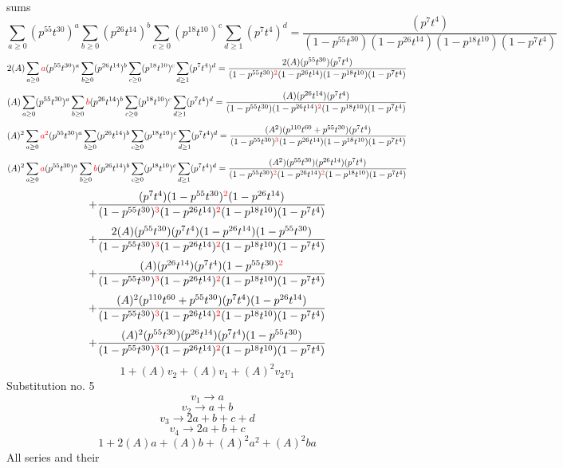 \documentclass{article}
\begin{document}
sums\[\sum_{a\geq{0}}(p^{55}t^{30})^{a}\sum_{b\geq{0}}(p^{26}t^{14})^{b}\sum_{c\geq{0}}(p^{18}t^{10})^{c}\sum_{d\geq{1}}(p^{7}t^{4})^{d}=\frac{(p^{7}t^{4})}{(1-p^{55}t^{30})(1-p^{26}t^{14})(1-p^{18}t^{10})(1-p^{7}t^{4})}\]\[2(A)\sum_{a\geq{0}}\textcolor{red}{a}(p^{55}t^{30})^{a}\sum_{b\geq{0}}(p^{26}t^{14})^{b}\sum_{c\geq{0}}(p^{18}t^{10})^{c}\sum_{d\geq{1}}(p^{7}t^{4})^{d}=\frac{2(A)(p^{55}t^{30})(p^{7}t^{4})}{(1-p^{55}t^{30})^{\textcolor{red}{2}}(1-p^{26}t^{14})(1-p^{18}t^{10})(1-p^{7}t^{4})}\]\[(A)\sum_{a\geq{0}}(p^{55}t^{30})^{a}\sum_{b\geq{0}}\textcolor{red}{b}(p^{26}t^{14})^{b}\sum_{c\geq{0}}(p^{18}t^{10})^{c}\sum_{d\geq{1}}(p^{7}t^{4})^{d}=\frac{(A)(p^{26}t^{14})(p^{7}t^{4})}{(1-p^{55}t^{30})(1-p^{26}t^{14})^{\textcolor{red}{2}}(1-p^{18}t^{10})(1-p^{7}t^{4})}\]\[(A)^{2}\sum_{a\geq{0}}\textcolor{red}{a^{2}}(p^{55}t^{30})^{a}\sum_{b\geq{0}}(p^{26}t^{14})^{b}\sum_{c\geq{0}}(p^{18}t^{10})^{c}\sum_{d\geq{1}}(p^{7}t^{4})^{d}=\frac{(A^{2})(p^{110}t^{60}+p^{55}t^{30})(p^{7}t^{4})}{(1-p^{55}t^{30})^{\textcolor{red}{3}}(1-p^{26}t^{14})(1-p^{18}t^{10})(1-p^{7}t^{4})}\]\[(A)^{2}\sum_{a\geq{0}}\textcolor{red}{a}(p^{55}t^{30})^{a}\sum_{b\geq{0}}\textcolor{red}{b}(p^{26}t^{14})^{b}\sum_{c\geq{0}}(p^{18}t^{10})^{c}\sum_{d\geq{1}}(p^{7}t^{4})^{d}=\frac{(A^{2})(p^{55}t^{30})(p^{26}t^{14})(p^{7}t^{4})}{(1-p^{55}t^{30})^{\textcolor{red}{2}}(1-p^{26}t^{14})^{\textcolor{red}{2}}(1-p^{18}t^{10})(1-p^{7}t^{4})}\]\[+\frac{(p^{7}t^{4})(1-p^{55}t^{30})^{\textcolor{red}{2}}(1-p^{26}t^{14})}{(1-p^{55}t^{30})^{\textcolor{red}{3}}(1-p^{26}t^{14})^{\textcolor{red}{2}}(1-p^{18}t^{10})(1-p^{7}t^{4})}\]\[+\frac{2(A)(p^{55}t^{30})(p^{7}t^{4})(1-p^{26}t^{14})(1-p^{55}t^{30})}{(1-p^{55}t^{30})^{\textcolor{red}{3}}(1-p^{26}t^{14})^{\textcolor{red}{2}}(1-p^{18}t^{10})(1-p^{7}t^{4})}\]\[+\frac{(A)(p^{26}t^{14})(p^{7}t^{4})(1-p^{55}t^{30})^{\textcolor{red}{2}}}{(1-p^{55}t^{30})^{\textcolor{red}{3}}(1-p^{26}t^{14})^{\textcolor{red}{2}}(1-p^{18}t^{10})(1-p^{7}t^{4})}\]\[+\frac{(A)^{2}(p^{110}t^{60}+p^{55}t^{30})(p^{7}t^{4})(1-p^{26}t^{14})}{(1-p^{55}t^{30})^{\textcolor{red}{3}}(1-p^{26}t^{14})^{\textcolor{red}{2}}(1-p^{18}t^{10})(1-p^{7}t^{4})}\]\[+\frac{(A)^{2}(p^{55}t^{30})(p^{26}t^{14})(p^{7}t^{4})(1-p^{55}t^{30})}{(1-p^{55}t^{30})^{\textcolor{red}{3}}(1-p^{26}t^{14})^{\textcolor{red}{2}}(1-p^{18}t^{10})(1-p^{7}t^{4})}\]\[1+(A)v_2+(A)v_1+(A)^2v_2v_1\]Substitution no. 5\[v_1\rightarrow{a}\]\[v_2\rightarrow{a+b}\]\[v_3\rightarrow{2a+b+c+d}\]\[v_4\rightarrow{2a+b+c}\]\[1+2(A)a+(A)b+(A)^2a^{2}+(A)^2ba\]All series and their 
\end{document}
